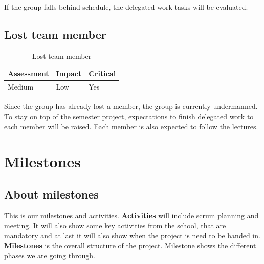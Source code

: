 If the group falls behind schedule, the delegated work tasks will be evaluated.

\subsection{Lost team member}
\begin{table}[ht]
    \begin{tabularx}{\textwidth}{|>{\RaggedRight}X|>{\RaggedRight}X|>{\RaggedRight}X|}
        \hline
        \textbf{Assessment} & \textbf{Impact} & \textbf{Critical} \\
        \hline
        Medium & Low & Yes \\
        \hline
    \end{tabularx}
    \caption{Lost team member} 
    \label{table:lost_team_member}
\end{table} 

Since the group has already lost a member, the group is currently undermanned.
To stay on top of the semester project, expectations to finish delegated work to
each member will be raised. Each member is also expected to follow the lectures.

\section{Milestones}

\subsection{About milestones}
This is our milestones and activities.  
\textbf{Activities} will include scrum planning and meeting.
It will also show some key activities from the school, that are mandatory
and at last it will also show when the project is need to be handed in.  
\textbf{Milestones} is the overall structure of the project.
Milestone shows the different phases we are going through.

